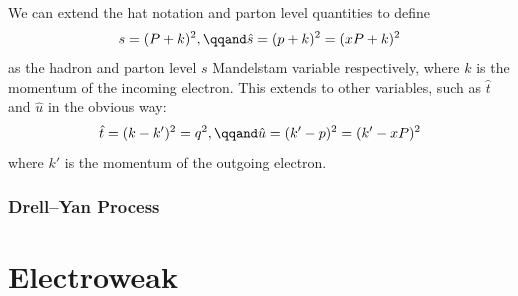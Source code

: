 \documentclass[fleqn]{NotesClass}
\newcommand{\amplitude}{\symcal{A}}
\begin{document}
    We can extend the hat notation and parton level quantities to define
    \begin{equation}
        s = (P + k)^2, \qqand \hat{s} = (p + k)^2 = (xP + k)^2
    \end{equation}
    as the hadron and parton level \(s\) Mandelstam variable respectively, where \(k\) is the momentum of the incoming electron.
    This extends to other variables, such as \(\hat{t}\) and \(\hat{u}\) in the obvious way:
    \begin{equation}
        \hat{t} = (k - k')^2 = q^2, \qqand \hat{u} = (k' - p)^2 = (k' - xP)^2
    \end{equation}
    where \(k'\) is the momentum of the outgoing electron.
    
    \section{Drell--Yan Process}
    
    
    
    
    
    
    
    
    \renewcommand{\amplitude}{\symcal{M}}    
    
    
    
    
    
    
    
    
    
    
    
    
    
    
    
    \part{Electroweak}
\end{document}
